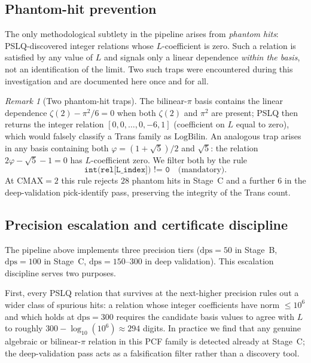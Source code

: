 \documentclass[11pt,a4paper]{amsart}
\theoremstyle{definition}
\theoremstyle{remark}
\newtheorem{remark}[theorem]{Remark}
\newcommand{\dps}{\mathrm{dps}}
\begin{document}
\subsection{Phantom-hit prevention}

The only methodological subtlety in the pipeline arises from
\emph{phantom hits}: PSLQ-discovered integer relations whose
$L$-coefficient is zero.  Such a relation is satisfied by any value of
$L$ and signals only a linear dependence \emph{within the basis},
not an identification of the limit.  Two such traps were encountered
during this investigation and are documented here once and for all.

\begin{remark}[Two phantom-hit traps]\label{rem:phantom}
The bilinear-$\pi$ basis contains the linear dependence
$\zeta(2) - \pi^2/6 = 0$ when both $\zeta(2)$ and $\pi^2$ are present;
PSLQ then returns the integer relation $[0,0,\dotsc,0,-6,1]$
(coefficient on $L$ equal to zero), which would falsely classify a
Trans family as $\mathrm{LogBilin}$.  An analogous trap arises in any
basis containing both $\varphi=(1+\sqrt5)/2$ and $\sqrt5$: the
relation $2\varphi - \sqrt5 - 1 = 0$ has $L$-coefficient zero.  We
filter both by the rule
\[
  \texttt{int(rel[L\_index]) != 0}
  \quad\text{(mandatory).}
\]
At $\mathrm{CMAX}=2$ this rule rejects $28$ phantom hits in Stage~C
and a further $6$ in the deep-validation pick-identify pass,
preserving the integrity of the Trans count.
\end{remark}

\subsection{Precision escalation and certificate discipline}

The pipeline above implements three precision tiers ($\dps=50$ in
Stage~B, $\dps=100$ in Stage~C, $\dps=150$--$300$ in deep
validation).  This escalation discipline serves two purposes.

First, every PSLQ relation that survives at the next-higher precision
rules out a wider class of spurious hits: a relation whose integer
coefficients have norm $\le 10^{6}$ and which holds at $\dps=300$
requires the candidate basis values to agree with $L$ to roughly
$300 - \log_{10}(10^{6}) \approx 294$ digits.  In practice we find
that any genuine algebraic or bilinear-$\pi$ relation in this PCF
family is detected already at Stage~C; the deep-validation pass acts
as a falsification filter rather than a discovery tool.
\end{document}
